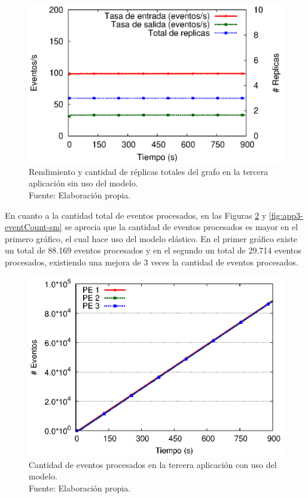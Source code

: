 \begin{figure}[!ht]
	\centering
	\captionsetup{justification=centering}
	\includegraphics[scale=0.7]{images/exp/app3/sm/logical/processSystem.eps}
    \caption[Rendimiento y cantidad de réplicas totales del grafo en la tercera aplicación sin uso del modelo.]{Rendimiento y cantidad de réplicas totales del grafo en la tercera aplicación sin uso del modelo.\\Fuente: Elaboración propia.}
	\label{fig:app3-processSystem-sm}
\end{figure}

En cuanto a la cantidad total de eventos procesados, en las Figuras \ref{fig:app3-eventCount-cm} y \ref{fig:app3-eventCount-sm} se aprecia que la cantidad de eventos procesados es mayor en el primero gráfico, el cual hace uso del modelo elástico. En el primer gráfico existe un total de 88.169 eventos procesados y en el segundo un total de 29.714 eventos procesados, existiendo una mejora de 3 veces la cantidad de eventos procesados.


\begin{figure}[!ht]
	\centering
	\captionsetup{justification=centering}
    \includegraphics[scale=0.75]{images/exp/app3/cm/logical/eventCount.eps}
    \caption[Cantidad de eventos procesados en la tercera aplicación con uso del modelo.]{Cantidad de eventos procesados en la tercera aplicación con uso del modelo.\\Fuente: Elaboración propia.}
    \label{fig:app3-eventCount-cm}
\end{figure}

